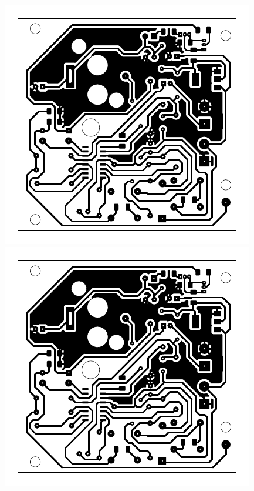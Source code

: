 \documentclass[12pt,a4paper]{article}
\begin{document}
	\vspace{.5cm}
\noindent
	\includegraphics{receiver-crop.pdf}
	\includegraphics{receiver-crop.pdf}\hfill
\end{document}
